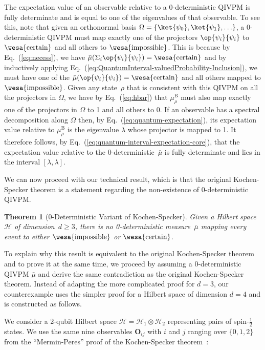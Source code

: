 \documentclass[english,reprint, aps, prl,superscriptaddress, showpacs,
showkeys, longbibliography, amsmath, amssymb, floatfix]{revtex4-1}
\theoremstyle{plain}
\newtheorem{thm}{Theorem}
\theoremstyle{definition}
\newcommand{\Hilb}{\mathcal{H}}
\newcommand{\imposs}{{\text{\wesa{impossible}}}}
\newcommand{\necess}{{\text{\wesa{certain}}}}
\newcommand{\proj}[1]{\op{#1}{#1}}
\begin{document}
The expectation value of an observable relative to a 0-deterministic
QIVPM is fully determinate and is equal to one of the eigenvalues of
that observable. To see this, note that given an orthonormal basis
$\Omega=\{ \ket{\psi_0},\ket{\psi_1},\ldots\}$, a 0-deterministic
QIVPM must map exactly one of the projectors $\proj{\psi_i}$ to
$\necess$ and all others to $\imposs$. This is because by
Eq.~(\ref{eq:necess}), we have
$\bar{\mu}(\Sigma_i{\proj{\psi_i}})=\necess$ and by inductively applying
Eq.~(\ref{eq:QuantumInterval-valuedProbability-Inclusion}), we must have
one of the $\bar{\mu}(\proj{\psi_i})=\necess$ and all others mapped to
$\imposs$. Given any state~$\rho$ that is consistent with this QIVPM
on all the projectors in $\Omega$, we have by Eq.~(\ref{eq:hbar}) that
$\mu_{\rho}^{\mathrm{B}}$ must also map exactly one of the projectors
in $\Omega$ to 1 and all others to 0. If an observable has a spectral
decomposition along $\Omega$ then, by
Eq.~(\ref{eq:quantum-expectation}), its expectation value relative to
$\mu_{\rho}^{\mathrm{B}}$ is the eigenvalue $\lambda$ whose projector
is mapped to 1. It therefore follows, by
Eq.~(\ref{eq:quantum-interval-expectation-core}), that the expectation
value relative to the 0-deterministic~${\bar{\mu}}$ is fully
determinate and lies in the interval $[\lambda,\lambda]$.

We can now proceed with our technical result, which is that the
original Kochen-Specker theorem is a statement regarding the
non-existence of $0$-deterministic QIVPM. 

\begin{thm}[0-Deterministic Variant of
  Kochen-Specker] \label{thm:Kochen-Specker} Given a Hilbert space
  $\Hilb$ of dimension~$d\ge3$, there is no 0-deterministic
  measure~$\bar{\mu}$ mapping every event to either $\imposs$ or
  $\necess$.
\end{thm}

\noindent To explain why this result is equivalent to the original
Kochen-Specker theorem and to prove it at the same time, we proceed by
assuming a 0-deterministic QIVPM $\bar{\mu}$ and derive the same
contradiction as the original Kochen-Specker theorem. Instead of
adapting the more complicated proof for $d=3$, our counterexample uses
the simpler proof for a Hilbert space of dimension $d=4$ and is
constructed as follows.

We consider a 2-qubit Hilbert space $\Hilb=\Hilb_1\otimes\Hilb_2$
representing pairs of spin-$\frac{1}{2}$ states. We use the same nine
observables $\mathbf{O}_{ij}$ with $i$ and $j$ ranging over
$\{0,1,2\}$ from the ``Mermin-Peres'' proof of the Kochen-Specker
theorem~\cite{Mermin1990Simple,peres1995quantum}:
\end{document}
